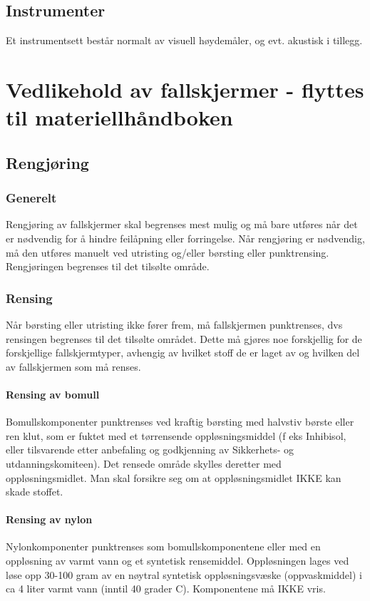 \subsection{Instrumenter}
Et instrumentsett består normalt av visuell høydemåler, og evt. akustisk i tillegg.

\section[Vedlikehold av fallskjermer]{Vedlikehold av fallskjermer - flyttes til materiellhåndboken}
\subsection{Rengjøring}
\subsubsection{Generelt}
Rengjøring av fallskjermer skal begrenses mest mulig og må bare utføres når det er nødvendig for å hindre feilåpning eller forringelse. Når rengjøring er nødvendig, må den utføres manuelt ved utristing og/eller børsting eller punktrensing. Rengjøringen begrenses til det tilsølte område.

\subsubsection{Rensing}
Når børsting eller utristing ikke fører frem, må fallskjermen punktrenses, dvs rensingen begrenses til det tilsølte området. Dette må gjøres noe forskjellig for de forskjellige fallskjermtyper, avhengig av hvilket stoff de er laget av og hvilken del av fallskjermen som må renses.

\paragraph{Rensing av bomull}
Bomullskomponenter punktrenses ved kraftig børsting med halvstiv børste eller ren klut, som er fuktet med et tørrensende oppløsningsmiddel (f eks Inhibisol, eller tilsvarende etter anbefaling og godkjenning av Sikkerhets- og utdanningskomiteen). Det rensede område skylles deretter med oppløsningsmidlet. Man skal forsikre seg om at oppløsningsmidlet IKKE kan skade stoffet.

\paragraph{Rensing av nylon}
Nylonkomponenter punktrenses som bomullskomponentene eller med en oppløsning av varmt vann og et syntetisk rensemiddel. Oppløsningen lages ved løse opp 30-100 gram av en nøytral syntetisk oppløsningsvæske (oppvaskmiddel) i ca 4 liter varmt vann (inntil 40 grader C). Komponentene må IKKE vris.

